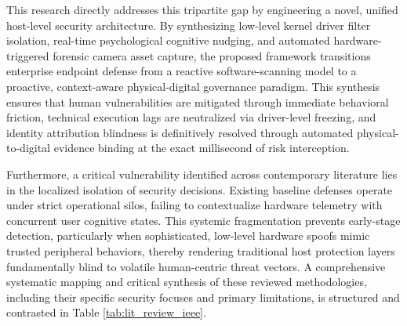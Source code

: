\documentclass{ieeeaccess}
\begin{document}
This research directly addresses this tripartite gap by engineering a novel, unified host-level security architecture. By synthesizing low-level kernel driver filter isolation, real-time psychological cognitive nudging, and automated hardware-triggered forensic camera asset capture, the proposed framework transitions enterprise endpoint defense from a reactive software-scanning model to a proactive, context-aware physical-digital governance paradigm. This synthesis ensures that human vulnerabilities are mitigated through immediate behavioral friction, technical execution lags are neutralized via driver-level freezing, and identity attribution blindness is definitively resolved through automated physical-to-digital evidence binding at the exact millisecond of risk interception.

Furthermore, a critical vulnerability identified across contemporary literature lies in the localized isolation of security decisions. Existing baseline defenses operate under strict operational silos, failing to contextualize hardware telemetry with concurrent user cognitive states. This systemic fragmentation prevents early-stage detection, particularly when sophisticated, low-level hardware spoofs mimic trusted peripheral behaviors, thereby rendering traditional host protection layers fundamentally blind to volatile human-centric threat vectors. A comprehensive systematic mapping and critical synthesis of these reviewed methodologies, including their specific security focuses and primary limitations, is structured and contrasted in Table \ref{tab:lit_review_ieee}.
\begin{table}[htbp]
\centering
\caption{Systematic Mapping and Synthesis of Related Work}
\label{tab:lit_review_ieee}
\end{table}
\end{document}
